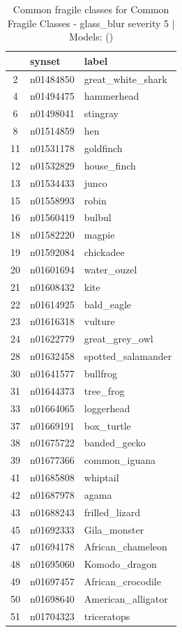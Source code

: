 \begin{table}
\caption{Common fragile classes for Common Fragile Classes - glass_blur severity 5 | Models: ()}
\label{tab:Common Fragile Classes - glass_blur severity 5_d41d8cd9}
\begin{tabular}{cll}
\toprule
 & synset & label \\
\midrule
2 & n01484850 & great_white_shark \\
4 & n01494475 & hammerhead \\
6 & n01498041 & stingray \\
8 & n01514859 & hen \\
11 & n01531178 & goldfinch \\
12 & n01532829 & house_finch \\
13 & n01534433 & junco \\
15 & n01558993 & robin \\
16 & n01560419 & bulbul \\
18 & n01582220 & magpie \\
19 & n01592084 & chickadee \\
20 & n01601694 & water_ouzel \\
21 & n01608432 & kite \\
22 & n01614925 & bald_eagle \\
23 & n01616318 & vulture \\
24 & n01622779 & great_grey_owl \\
28 & n01632458 & spotted_salamander \\
30 & n01641577 & bullfrog \\
31 & n01644373 & tree_frog \\
33 & n01664065 & loggerhead \\
37 & n01669191 & box_turtle \\
38 & n01675722 & banded_gecko \\
39 & n01677366 & common_iguana \\
41 & n01685808 & whiptail \\
42 & n01687978 & agama \\
43 & n01688243 & frilled_lizard \\
45 & n01692333 & Gila_monster \\
47 & n01694178 & African_chameleon \\
48 & n01695060 & Komodo_dragon \\
49 & n01697457 & African_crocodile \\
50 & n01698640 & American_alligator \\
51 & n01704323 & triceratops \\

\end{tabular}
\end{table}
